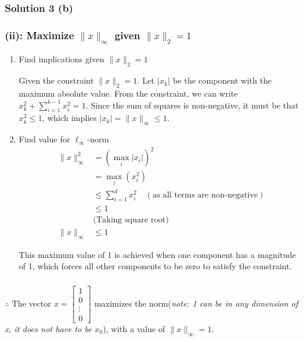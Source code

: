 \documentclass{article}
\begin{document}
\subsubsection*{Solution 3 (b)}
\subsubsection*{(ii): Maximize $\|x\|_{\infty}$ given $\|x\|_{2}=1$}
\begin{enumerate}
  \item Find implications given $\|x\|_{2}=1$

\begin{flushleft}
Given the constraint $\|x\|_{2} = 1$. Let $|x_k|$ be the component with the maximum absolute value. From the constraint, we can write $x_k^2 + \sum_{i=1}^{k-1} x_i^2 = 1$. Since the sum of squares is non-negative, it must be that $x_k^2 \le 1$, which implies $|x_k| = \|x\|_{\infty} \le 1$.
\end{flushleft}
  \item Find value for $\ell_{\infty}$-norm
\begin{align*}
    \|x\|_{\infty}^2 &= (\max_i |x_i|)^2 \\
    &= \max_i (x_i^2) \\
    &\le \sum_{i=1}^d x_i^2 \quad (\text{as all terms are non-negative}) \\
    &\le 1 \\
    &\text{(Taking square root)} \\
    \|x\|_{\infty} &\le 1
\end{align*}

\begin{flushleft}
This maximum value of 1 is achieved when one component has a magnitude of 1, which forces all other components to be zero to satisfy the constraint.
\end{flushleft}
\end{enumerate}

\subsubsection*{\normalfont}{$\therefore$ The vector $x=\begin{bmatrix} 1 \\ 0 \\ \vdots \\ 0 \end{bmatrix}$ maximizes the norm(\textit{note: 1 can be in any dimension of x, it does not have to be $x_0$}), with a value of $\|x\|_{\infty}=1$.}
\end{document}
